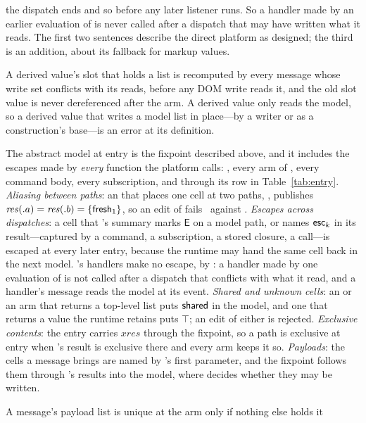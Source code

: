 \begin{description}[leftmargin=1.2em,font=\normalfont\itshape]
the dispatch ends and so before any later listener runs. So a handler made by an earlier evaluation of
 is never called after a dispatch that may have written what it reads. The first two
sentences describe the direct platform as designed; the third is an addition, about its fallback for
markup values.
\item[\Obl{P4}, slots are recomputed.] A derived value's slot that holds a list is recomputed by every
message whose write set conflicts with its reads, before any DOM write reads it, and the old slot value
is never dereferenced after the arm. A derived value only reads the model, so a derived value that
writes a model list in place---by a writer or as a construction's base---is an error at its definition.
\item[\Obl{P5}, the entry is checked as a call.] The abstract model at entry is the fixpoint described
above, and it includes the escapes made by \emph{every} function the platform calls: , every
arm of , every command body, every subscription, and  through its row in
Table~\ref{tab:entry}. \emph{Aliasing between paths}: an  that places one cell at two paths,
, publishes $\mathit{res}(.a) = \mathit{res}(.b) = \{\mathsf{fresh}_1\}$, so an
edit of  fails \Disjoint\ against . \emph{Escapes across dispatches}: a cell
that 's summary marks $\mathsf{E}$ on a model path, or names $\mathsf{esc}_k$ in its result---captured
by a command, a subscription, a stored closure, a  call---is escaped at every later entry,
because the runtime may hand the same cell back in the next model. 's handlers make no escape,
by : a handler made by one evaluation of  is not called after a dispatch that conflicts
with what it read, and a handler's message reads the model at its event. \emph{Shared and unknown cells}:
an  or an arm that returns a top-level list puts $\mathsf{shared}$ in the model, and one that returns a
value the runtime retains puts $\top$; an edit of either is rejected. \emph{Exclusive contents}: the entry
carries $\mathit{xres}$ through the fixpoint, so a path is exclusive at entry when 's result is
exclusive there and every arm keeps it so. \emph{Payloads}: the cells a message brings are named by
's first parameter, and the fixpoint follows them through 's results into the
model, where  decides whether they may be written.
\item[\Obl{P6}, payloads.] A message's payload list is unique at the arm only if nothing else holds it

\end{description}
